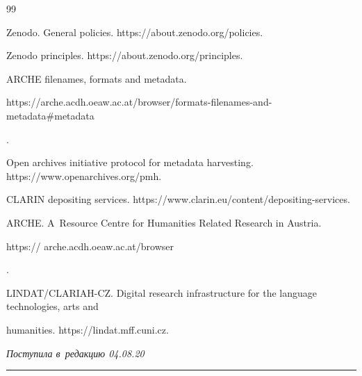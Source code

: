 {{\begin{thebibliography}{99}

Zenodo. General policies. {\sf https://about.zenodo.org/policies}.


Zenodo principles. {\sf https://about.zenodo.org/principles}.


ARCHE filenames, formats and metadata. {\sf 

 https://arche.acdh.oeaw.ac.at/\linebreak browser/formats-filenames-and-metadata\#metadata}.


Open archives initiative protocol for metadata harvesting. {\sf https://www.openarchives.\linebreak org/pmh}.


CLARIN depositing services. {\sf https://www.clarin.eu/content/depositing-services}.




ARCHE. A~Resource Centre for Humanities Related Research in Austria. {\sf 

https:// arche.acdh.oeaw.ac.at/browser}.


LINDAT/CLARIAH-CZ. Digital research infrastructure for the language technologies, arts and 

humanities. {\sf https://lindat.mff.cuni.cz}.

    \end{thebibliography}

} }





\vspace*{-3pt}



\hfill{\small\textit{Поступила в~редакцию 04.08.20}}









\vspace*{6pt}



\hrule



\vspace*{2pt}



